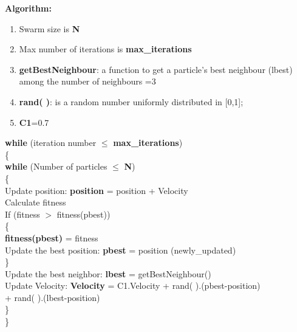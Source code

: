 \documentclass[a4paper,12pt]{report}
\begin{document}
\begin{flushleft}
\noindent \textbf{Algorithm:}\\
\begin{enumerate}
    \item Swarm size is \textbf{N}
    \item Max number of iterations is \textbf{max\_iterations}
    \item \textbf{getBestNeighbour}: a function to get a particle’s best neighbour (lbest) among the number of neighbours =3
    \item \textbf{rand( )}: is a random number uniformly distributed in [0,1];
    \item \textbf{C1}=0.7
\end{enumerate}
\pagebreak
\begin{flushleft}
\quad \textbf{while} (iteration number $\leq$ \textbf{max\_iterations})\\
\quad \{\\
\quad \quad \textbf{while} (Number of particles $\leq$ \textbf{N})\\
\quad \quad \{\\
\quad \quad \quad Update position: \textbf{position} = position + Velocity\\
\quad \quad \quad Calculate fitness\\
\quad \quad \quad If (fitness $>$ fitness(pbest))\\
\quad \quad \quad \{\\
\quad \quad \quad \quad \textbf{fitness(pbest)} = fitness\\
\quad \quad \quad \quad Update the best position: \textbf{pbest} = position (newly\_updated)\\
\quad \quad \quad \}\\
\quad \quad \quad Update the best neighbor: \textbf{lbest} = getBestNeighbour()\\
\quad \quad \quad Update Velocity: \textbf{Velocity} = C1.Velocity + rand( ).(pbest-position)\\ 
\quad \quad \quad + rand( ).(lbest-position)\\
\quad \quad \}\\
\quad \}\\
\end{flushleft}

\quad 

\end{flushleft}



\end{document}
